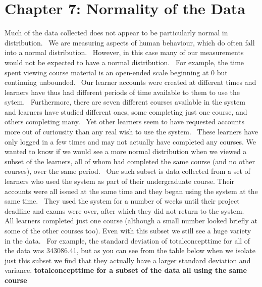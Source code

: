 \documentclass[12pt,twoside]{article}
\begin{document}
\section[Chapter 7: Normality of the Data ]{Chapter 7: Normality of the
Data }
\newline
Much of the data collected does not appear to be particularly normal in
distribution.~ We are measuring aspects of human behaviour, which do
often fall into a normal distribution.~ However, in this case many of
our measurements would not be expected to have a normal distribution.~
For example, the time spent viewing course material is an open{}-ended
scale beginning at 0 but continuing unbounded.~ Our learner accounts
were created at different times and learners have thus had different
periods of time available to them to use the sytem.~ Furthermore, there
are seven different courses available in the system and learners have
studied different ones, some completing just one course, and others
completing many.~ Yet other learners seem to have requested accounts
more out of curiousity than any real wish to use the system.~ These
learners have only logged in a few times and may not actually have
completed any courses.\newline
We wanted to know if we would see a more normal distribution when we
viewed a subset of the learners, all of whom had completed the same
course (and no other courses), over the same period.~ One such subset
is data collected from a set of learners who used the system as part of
their undergraduate course. Their accounts were all issued at the same
time and they began using the system at the same time.~ They used the
system for a number of weeks until their project deadline and exams
were over, after which they did not return to the system.~ All learners
completed just one course (although a small number looked briefly at
some of the other courses too).\newline
Even with this subset we still see a huge variety in the data.~ For
example, the standard deviation of totalconcepttime for all of the data
was 343086.41, but as you can see from the table below when we isolate
just this subset we find that they actually have a larger standard
deviation and variance.\newline
\newline
\textbf{totalconcepttime for a subset of the data all using the same
course}
\end{document}
